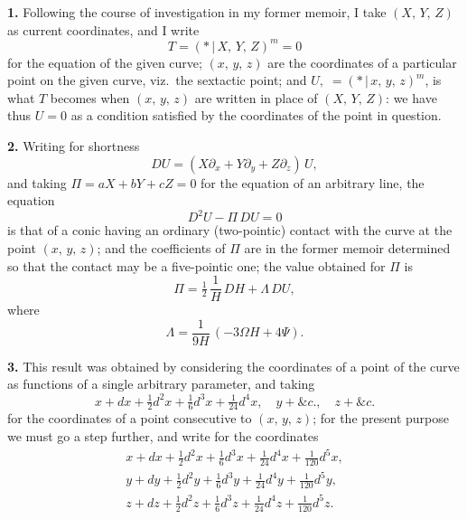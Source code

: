 \documentclass[11pt,a4paper]{article}
\providecommand{\mid}{\,|\,}
\begin{document}
\textbf{1.} Following the course of investigation in my former memoir, I take $(X,\,Y,\,Z)$ as current coordinates, and I write
\[
T = (*\mid X,\,Y,\,Z)^{m} = 0
\]
for the equation of the given curve; $(x,\,y,\,z)$ are the coordinates of a particular point on the given curve, viz.\ the sextactic point; and $U,\;=(*\mid x,\,y,\,z)^{m}$, is what $T$ becomes when $(x,\,y,\,z)$ are written in place of $(X,\,Y,\,Z)$: we have thus $U = 0$ as a condition satisfied by the coordinates of the point in question.

\medskip

\textbf{2.} Writing for shortness
\[
DU = (X\partial_{x} + Y\partial_{y} + Z\partial_{z})\,U,
\]
and taking $\Pi = aX + bY + cZ = 0$ for the equation of an arbitrary line, the equation
\[
D^{2}U - \Pi\,DU = 0
\]
is that of a conic having an ordinary (two-pointic) contact with the curve at the point $(x,\,y,\,z)$; and the coefficients of $\Pi$ are in the former memoir determined so that the contact may be a five-pointic one; the value obtained for $\Pi$ is
\[
\Pi = \tfrac{1}{2}\,\frac{1}{H}\,DH + \Lambda\,DU,
\]
where
\[
\Lambda = \frac{1}{9H}\,(-3\Omega H + 4\Psi).
\]

\medskip

\textbf{3.} This result was obtained by considering the coordinates of a point of the curve as functions of a single arbitrary parameter, and taking
\[
x + dx + \tfrac{1}{2}d^{2}x + \tfrac{1}{6}d^{3}x + \tfrac{1}{24}d^{4}x,\quad y + \&c.,\quad z + \&c.
\]
for the coordinates of a point consecutive to $(x,\,y,\,z)$; for the present purpose we must go a step further, and write for the coordinates
\[
\begin{aligned}
x + dx + \tfrac{1}{2}d^{2}x + \tfrac{1}{6}d^{3}x + \tfrac{1}{24}d^{4}x + \tfrac{1}{120}d^{5}x,\\
y + dy + \tfrac{1}{2}d^{2}y + \tfrac{1}{6}d^{3}y + \tfrac{1}{24}d^{4}y + \tfrac{1}{120}d^{5}y,\\
z + dz + \tfrac{1}{2}d^{2}z + \tfrac{1}{6}d^{3}z + \tfrac{1}{24}d^{4}z + \tfrac{1}{120}d^{5}z.
\end{aligned}
\]

\medskip
\end{document}
